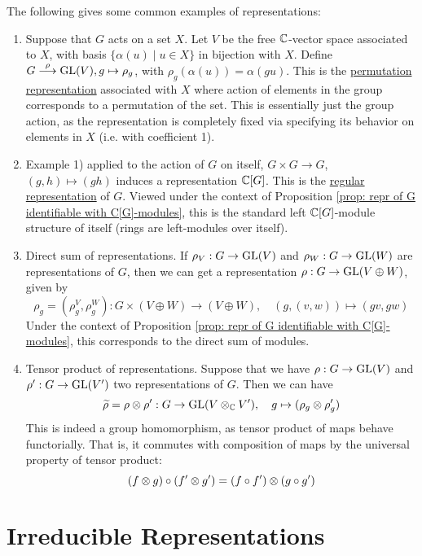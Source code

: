 \documentclass{article}
\begin{document}
\textstart
The following gives some common examples of representations:
\begin{enumerate}[label=\arabic*)]
    \item Suppose that $G$ acts on a set $X$. Let $V$ be the free $\mathbb{C}$-vector space associated to $X$, with basis $\{ \alpha(u) \mid u \in X \}$ in bijection with $X$. Define $G \overset{\rho}{\longrightarrow} \mathrm{GL}(V), g \mapsto \rho_g$, with $\rho_g(\alpha(u)) = \alpha(gu)$. This is the \underline{permutation representation} associated with $X$ where action of elements in the group corresponds to a permutation of the set. This is essentially just the group action, as the representation is completely fixed via specifying its behavior on elements in $X$ (i.e. with coefficient 1). 
    \item Example 1) applied to the action of $G$ on itself, $G \times G \to G$, $(g, h) \mapsto (gh)$ induces a representation $\mathbb{C}[G]$. This is the \underline{regular representation} of $G$. Viewed under the context of Proposition \ref{prop: repr of G identifiable with C[G]-modules}, this is the standard left $\mathbb{C}[G]$-module structure of itself (rings are left-modules over itself). 
    \item Direct sum of representations. If $\rho_V: G \to \mathrm{GL}(V)$ and $\rho_W: G \to \mathrm{GL}(W)$ are representations of $G$, then we can get a representation $\rho: G \to \mathrm{GL}(V \oplus W)$, given by 
    \[
        \rho_g = (\rho_g^V, \rho_g^W): G \times (V \oplus W) \to (V \oplus W), \quad (g, (v, w)) \mapsto (gv, gw)
    \]
    Under the context of Proposition \ref{prop: repr of G identifiable with C[G]-modules}, this corresponds to the direct sum of modules. 
    \item Tensor product of representations. Suppose that we have $\rho: G \to \mathrm{GL}(V)$ and $\rho': G \to \mathrm{GL}(V')$ two representations of $G$. Then we can have
    \[
        \widetilde{\rho} = \rho \otimes \rho': G \to \mathrm{GL}(V \otimes_{\mathbb{C}} V'), \quad g \mapsto (\rho_g \otimes \rho_g')
    \]
    This is indeed a group homomorphism, as tensor product of maps behave functorially. That is, it commutes with composition of maps by the universal property of tensor product:
    \[
        (f \otimes g) \circ (f' \otimes g') = (f \circ f') \otimes (g \circ g')
    \]
\end{enumerate}

\section{Irreducible Representations}
\end{document}
